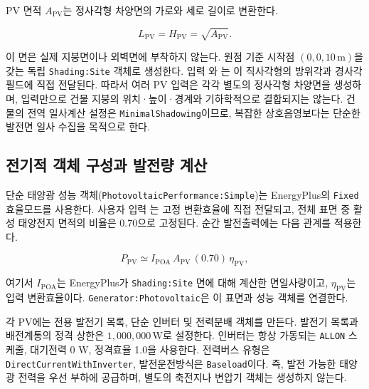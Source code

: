 PV 면적 $A_{\mathrm{PV}}$는 정사각형 차양면의 가로와 세로 길이로 변환한다.

\begin{equation}
  L_{\mathrm{PV}}=H_{\mathrm{PV}}=\sqrt{A_{\mathrm{PV}}}.
  \label{eq:pv-square-dimension}
\end{equation}

이 면은 실제 지붕면이나 외벽면에 부착하지 않는다. 원점 기준 시작점 $(0,0,10\,\mathrm{m})$을 갖는 독립 \texttt{Shading:}\allowbreak\texttt{Site} 객체로 생성한다. 입력 와 는 이 직사각형의 방위각과 경사각 필드에 직접 전달된다. 따라서 여러 PV 입력은 각각 별도의 정사각형 차양면을 생성하며, 입력만으로 건물 지붕의 위치·높이·경계와 기하학적으로 결합되지는 않는다. 건물의 전역 일사계산 설정은 \texttt{MinimalShadowing}이므로, 복잡한 상호음영보다는 단순한 발전면 일사 수집을 목적으로 한다.

\subsection{전기적 객체 구성과 발전량 계산}

단순 태양광 성능 객체(\texttt{PhotovoltaicPerformance:}\allowbreak\texttt{Simple})는 EnergyPlus의 \texttt{Fixed} 효율모드를 사용한다. 사용자 입력 는 고정 변환효율에 직접 전달되고, 전체 표면 중 활성 태양전지 면적의 비율은 0.70으로 고정된다. 순간 발전출력에는 다음 관계를 적용한다.

\begin{equation}
  P_{\mathrm{PV}} \simeq I_{\mathrm{POA}}\,A_{\mathrm{PV}}\,(0.70)\,\eta_{\mathrm{PV}},
  \label{eq:pv-simple-power}
\end{equation}

여기서 $I_{\mathrm{POA}}$는 EnergyPlus가 \texttt{Shading:Site} 면에 대해 계산한 면일사량이고, $\eta_{\mathrm{PV}}$는 입력 변환효율이다. \texttt{Generator:Photovoltaic}은 이 표면과 성능 객체를 연결한다.

각 PV에는 전용 발전기 목록, 단순 인버터 및 전력분배 객체를 만든다. 발전기 목록과 배전계통의 정격 상한은 $1{,}000{,}000\,\mathrm{W}$로 설정한다. 인버터는 항상 가동되는 \texttt{ALLON} 스케줄, 대기전력 0 W, 정격효율 1.0을 사용한다. 전력버스 유형은 \texttt{DirectCurrentWithInverter}, 발전운전방식은 \texttt{Baseload}이다. 즉, 발전 가능한 태양광 전력을 우선 부하에 공급하며, 별도의 축전지나 변압기 객체는 생성하지 않는다.

